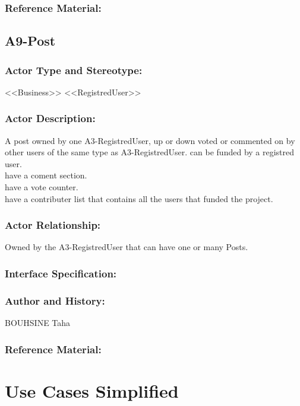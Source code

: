 \documentclass[11pt, openany]{report}
\begin{document}
\subsubsection{Reference Material:}

\clearpage
\subsection{A9-Post}
\label{A9}
\subsubsection{Actor Type and Stereotype:}
<<Business>> <<RegistredUser>>
\subsubsection{Actor Description:}
A post owned by one A3-RegistredUser, up or down voted or commented on by other users of the same type as A3-RegistredUser.
can be funded by a registred user.\\
have a coment section.\\
have a vote counter.\\
have a contributer list that contains all the users that funded the project.\\

\subsubsection{Actor Relationship:}
Owned by the A3-RegistredUser that can have one or many Posts.
\subsubsection{Interface Specification:}
\subsubsection{Author and History:}
BOUHSINE Taha
\subsubsection{Reference Material:}

\clearpage

\section{Use Cases Simplified}
\
\end{document}
